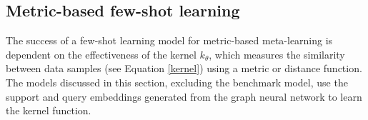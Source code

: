 



\subsection{Metric-based few-shot learning}

The success of a few-shot learning model for metric-based meta-learning is dependent on the effectiveness of the kernel $k_\theta$, which measures the similarity between data samples (see Equation \ref{kernel}) using a metric or distance function. The models discussed in this section, excluding the benchmark model, use the support and query embeddings generated from the graph neural network to learn the kernel function.

